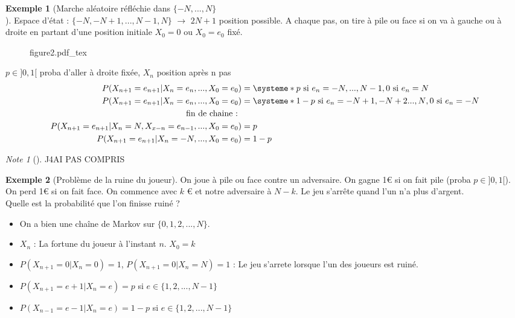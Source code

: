 \documentclass{article}
\newcommand{\incfig}[2][1]{%
	\def\svgwidth{#1\columnwidth}
	{#2.pdf_tex}
}
\theoremstyle{plain}%
\theoremstyle{definition}
\newtheorem{exmp}{Exemple}[section]
\theoremstyle{remark}
\newtheorem*{note}{Note}
\begin{document}
	\begin{exmp}[Marche aléatoire réfléchie dans $\{-N, ..., N\}$\\]
		Espace d'état : $ \{-N, -N+1, ..., N-1, N\} $ $\rightarrow$ $2N+1$ position possible. A chaque pas, on tire à pile ou face si on va à gauche ou à droite en partant d'une position initiale $ X_0=0 \text{ ou } X_0 = e_0$ fixé.

		\begin{figure}[!htbp]
			\centering
			\incfig[0.5]{figure2}
			\caption{}
			\label{}
		\end{figure}

		$ p \in ]0,1[ $ proba d'aller à droite fixée, $ X_n $ position après n pas 
		\begin{align*}
			P(X_{n+1}=e_{n+1} | X_n = e_n, ..., X_0=e_0) &= \systeme*{
				p \text{ si } e_n = {-N, ..., N-1},
				0 \text{ si } e_n = N
			} \\
			P(X_{n+1}=e_{n+1} | X_n = e_n, ..., X_0=e_0) &= \systeme*{
				{1-p} \text{ si } e_n = {-N+1, -N+2 ..., N}, 
				0 \text{ si } e_n = -N
			} \\
			\text{fin de chaine : }& \\
			P(X_{n+1}=e_{n+1} | X_n = N, X_{x-n} = e_{n-1}, ..., X_0=e_0) &= p \\
			P(X_{n+1}=e_{n+1} | X_n = -N, ..., X_0=e_0) &= 1-p
		\end{align*}
		\begin{note}[]
			J4AI PAS COMPRIS 
		\end{note}
		
		
	\end{exmp}
	
	\begin{exmp}[Problème de la ruine du joueur]
		On joue à pile ou face contre un adversaire. On gagne 1€ si on fait pile (proba $ p \in ]0,1[ $). On perd 1€ si on fait face. On commence avec $ k $ € et notre adversaire à $ N-k $. Le jeu s'arrête quand l'un n'a plus d'argent. \\
		Quelle est la probabilité que l'on finisse ruiné ?

		\begin{itemize}
			\item On a bien une chaîne de Markov sur $ \{0, 1, 2, ..., N\} $. 
			\item $ X_n $  : La fortune du joueur à l'instant $ n $. $X_0 = k$
			\item  $ P(X_{n+1} = 0| X_n = 0) = 1 $, $ P(X_{n+1} = 0 | X_n = N) = 1 $ : Le jeu s'arrete lorsque l'un des joueurs est ruiné.
			\item $ P(X_{n+1} = e+1 | X_n = e) = p $ si $ e \in \{1,2,...,N-1\} $   
			\item $ P(X_{n-1} = e-1 | X_n = e) = 1-p $ si $ e \in \{1,2,...,N-1\} $   
		\end{itemize}
	\end{exmp}
\end{document}
